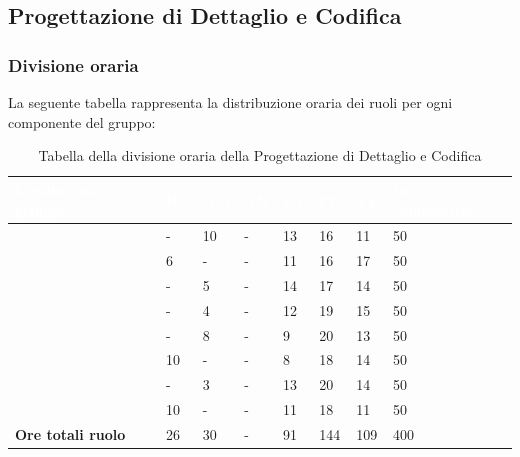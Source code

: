 \subsection{Progettazione di Dettaglio e Codifica}

\subsubsection{Divisione oraria}
La seguente tabella rappresenta la distribuzione oraria dei ruoli per ogni componente del gruppo:
{
\renewcommand{\arraystretch}{2}
\begin{longtable}[h!] { C{4cm} C{1cm} C{1cm} C{1cm} C{1cm} C{1cm} C{1cm} C{3cm}}
\caption{Tabella della divisione oraria della Progettazione di Dettaglio e Codifica}\\

\textcolor{white}{\textbf{Membro del gruppo}} & 
\textcolor{white}{\textbf{RE}} & 
\textcolor{white}{\textbf{AM}} & 
\textcolor{white}{\textbf{AN}} & 
\textcolor{white}{\textbf{PT}} & 
\textcolor{white}{\textbf{PR}} & 
\textcolor{white}{\textbf{VE}} & 
\textcolor{white}{\textbf{Ore complessive}}\\
\endhead

\MC{}                     &  - & 10 & - & 13 &  16 &  11 &  50 \\
\LD{}                     &  6 &  - & - & 11 &  16 &  17 &  50 \\
\CE{}                     &  - &  5 & - & 14 &  17 &  14 &  50 \\
\SE{}                     &  - &  4 & - & 12 &  19 &  15 &  50 \\
\PF{}                     &  - &  8 & - &  9 &  20 &  13 &  50 \\
\DF{}                     & 10 &  - & - &  8 &  18 &  14 &  50 \\
\BR{}                     &  - &  3 & - & 13 &  20 &  14 &  50 \\
\AT{}                     & 10 &  - & - & 11 &  18 &  11 &  50 \\
\textbf{Ore totali ruolo} & 26 & 30 & - & 91 & 144 & 109 & 400 \\

\end{longtable}
}

